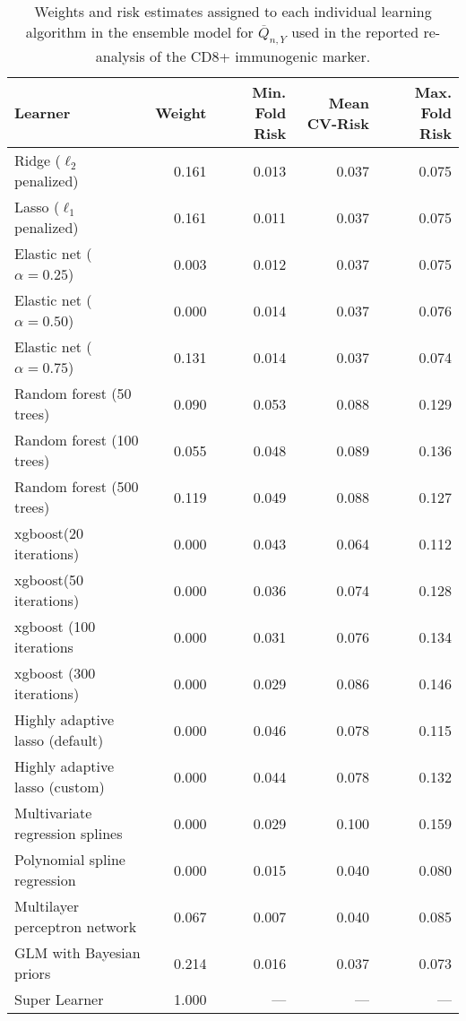 \begin{table}[H]
\caption{\label{tab:cd8_sl_coefs} Weights and risk estimates assigned to each
  individual learning algorithm in the ensemble model for $\overline{Q}_{n,Y}$
  used in the reported re-analysis of the CD8+ immunogenic marker.}
\centering
\begin{tabular}[t]{l|r|r|r|r}
\hline
Learner & Weight & Min. Fold Risk & Mean CV-Risk & Max. Fold Risk\\
\hline
Ridge ($\ell_2$ penalized) & 0.161 & 0.013 & 0.037 & 0.075\\
\hline
Lasso ($\ell_1$ penalized) & 0.161 & 0.011 & 0.037 & 0.075\\
\hline
Elastic net ($\alpha = 0.25$) & 0.003 & 0.012 & 0.037 & 0.075\\
\hline
Elastic net ($\alpha = 0.50$) & 0.000 & 0.014 & 0.037 & 0.076\\
\hline
Elastic net ($\alpha = 0.75$) & 0.131 & 0.014 & 0.037 & 0.074\\
\hline
Random forest (50 trees) & 0.090 & 0.053 & 0.088 & 0.129\\
\hline
Random forest (100 trees) & 0.055 & 0.048 & 0.089 & 0.136\\
\hline
Random forest (500 trees) & 0.119 & 0.049 & 0.088 & 0.127\\
\hline
xgboost(20 iterations) & 0.000 & 0.043 & 0.064 & 0.112\\
\hline
xgboost(50 iterations) & 0.000 & 0.036 & 0.074 & 0.128\\
\hline
xgboost (100 iterations & 0.000 & 0.031 & 0.076 & 0.134\\
\hline
xgboost (300 iterations) & 0.000 & 0.029 & 0.086 & 0.146\\
\hline
Highly adaptive lasso (default) & 0.000 & 0.046 & 0.078 & 0.115\\
\hline
Highly adaptive lasso (custom) & 0.000 & 0.044 & 0.078 & 0.132\\
\hline
Multivariate regression splines & 0.000 & 0.029 & 0.100 & 0.159\\
\hline
Polynomial spline regression & 0.000 & 0.015 & 0.040 & 0.080\\
\hline
Multilayer perceptron network & 0.067 & 0.007 & 0.040 & 0.085\\
\hline
GLM with Bayesian priors & 0.214 & 0.016 & 0.037 & 0.073\\
\hline
Super Learner & 1.000 & --- & --- & ---\\
\hline
\end{tabular}
\end{table}
